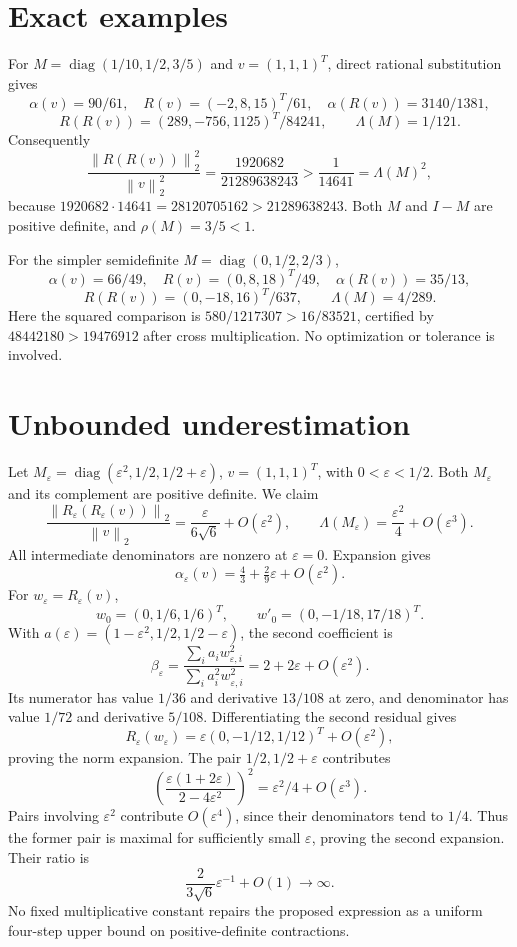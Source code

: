 \documentclass[11pt]{article}
\newcommand{\norm}[1]{\left\lVert#1\right\rVert}
\newcommand{\diag}{\operatorname{diag}}
\begin{document}
\section{Exact examples}
For $M=\diag(1/10,1/2,3/5)$ and $v=(1,1,1)^T$, direct rational substitution gives
\[
\alpha(v)=90/61,\quad R(v)=(-2,8,15)^T/61,\quad \alpha(R(v))=3140/1381,
\]
\[
R(R(v))=(289,-756,1125)^T/84241,\qquad \Lambda(M)=1/121.
\]
Consequently
\[
\frac{\norm{R(R(v))}_2^2}{\norm v_2^2}=\frac{1920682}{21289638243}>\frac1{14641}=\Lambda(M)^2,
\]
because $1920682\cdot14641=28120705162>21289638243$. Both $M$ and $I-M$ are positive definite, and $\rho(M)=3/5<1$.

For the simpler semidefinite $M=\diag(0,1/2,2/3)$,
\[
\alpha(v)=66/49,\quad R(v)=(0,8,18)^T/49,\quad\alpha(R(v))=35/13,
\]
\[
R(R(v))=(0,-18,16)^T/637,\qquad\Lambda(M)=4/289.
\]
Here the squared comparison is $580/1217307>16/83521$, certified by $48442180>19476912$ after cross multiplication. No optimization or tolerance is involved.
\section{Unbounded underestimation}
Let $M_\varepsilon=\diag(\varepsilon^2,1/2,1/2+\varepsilon)$, $v=(1,1,1)^T$, with $0<\varepsilon<1/2$. Both $M_\varepsilon$ and its complement are positive definite. We claim
\[
\frac{\norm{R_\varepsilon(R_\varepsilon(v))}_2}{\norm v_2}=\frac{\varepsilon}{6\sqrt6}+O(\varepsilon^2),
\qquad \Lambda(M_\varepsilon)=\frac{\varepsilon^2}{4}+O(\varepsilon^3).
\]
All intermediate denominators are nonzero at $\varepsilon=0$. Expansion gives
\[
\alpha_\varepsilon(v)=\tfrac43+\tfrac29\varepsilon+O(\varepsilon^2).
\]
For $w_\varepsilon=R_\varepsilon(v)$,
\[w_0=(0,1/6,1/6)^T,\qquad w'_0=(0,-1/18,17/18)^T.\]
With $a(\varepsilon)=(1-\varepsilon^2,1/2,1/2-\varepsilon)$, the second coefficient is
\[
\beta_\varepsilon=\frac{\sum_i a_iw_{\varepsilon,i}^2}{\sum_i a_i^2w_{\varepsilon,i}^2}=2+2\varepsilon+O(\varepsilon^2).
\]
Its numerator has value $1/36$ and derivative $13/108$ at zero, and denominator has value $1/72$ and derivative $5/108$. Differentiating the second residual gives
\[
R_\varepsilon(w_\varepsilon)=\varepsilon(0,-1/12,1/12)^T+O(\varepsilon^2),
\]
proving the norm expansion. The pair $1/2,1/2+\varepsilon$ contributes
\[
\left(\frac{\varepsilon(1+2\varepsilon)}{2-4\varepsilon^2}\right)^2=\varepsilon^2/4+O(\varepsilon^3).
\]
Pairs involving $\varepsilon^2$ contribute $O(\varepsilon^4)$, since their denominators tend to $1/4$. Thus the former pair is maximal for sufficiently small $\varepsilon$, proving the second expansion. Their ratio is
\[\boxed{\frac{2}{3\sqrt6}\varepsilon^{-1}+O(1)\longrightarrow\infty.}\]
No fixed multiplicative constant repairs the proposed expression as a uniform four-step upper bound on positive-definite contractions.
\end{document}
